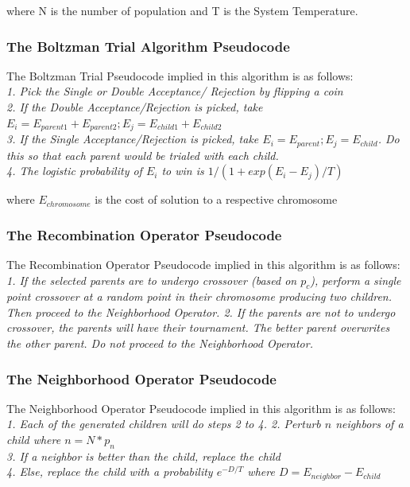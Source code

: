 \documentclass{article}
\begin{document}
where N is the number of population and T is the System Temperature.\\

\subsubsection{The Boltzman Trial Algorithm Pseudocode}
The Boltzman Trial Pseudocode implied in this algorithm is as follows:\\
\textit{
1. Pick the Single or Double Acceptance/ Rejection by flipping a coin\\
2. If the Double Acceptance/Rejection is picked, take $E_i = E_{parent1} + E_{parent2}; E_j = E_{child1} + E_{child2}$\\
3. If the Single Acceptance/Rejection is picked, take $E_i = E_{parent}; E_j = E_{child}$. Do this so that each parent would be trialed with each child.\\
4. The logistic probability of $E_i$ to win is $1/(1 + exp(E_i - E_j)/T)$\\
}

where $E_{chromosome}$ is the cost of solution to a respective chromosome

\subsubsection{The Recombination Operator Pseudocode}
The Recombination Operator Pseudocode implied in this algorithm is as follows:\\
\textit{
1. If the selected parents are to undergo crossover (based on $p_c$), perform a single point crossover at a random point in their chromosome producing two children. Then proceed to the Neighborhood Operator.
2. If the parents are not to undergo crossover, the parents will have their tournament. The better parent overwrites the other parent. Do not proceed to the Neighborhood Operator.
}

\subsubsection{The Neighborhood Operator Pseudocode}
The Neighborhood Operator Pseudocode implied in this algorithm is as follows:\\
\textit{
1. Each of the generated children will do steps 2 to 4.
2. Perturb $n$ neighbors of a child where $n = N*p_n$\\
3. If a neighbor is better than the child, replace the child\\
4. Else, replace the child with a probability $e^{-D/T}$ where $D = E_{neighbor} - E_{child}$\\
}
\end{document}
